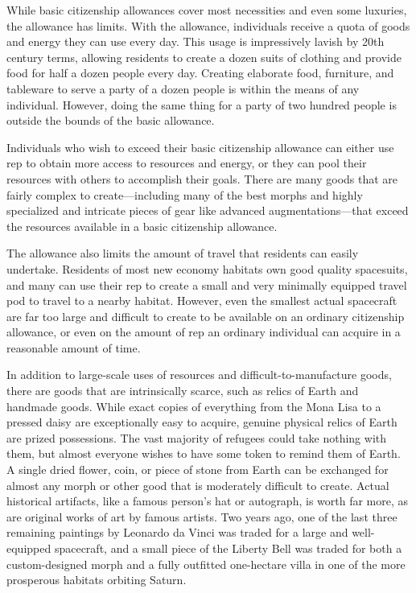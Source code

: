 While basic citizenship allowances cover most necessities and even some luxuries, the allowance has limits. 
With the allowance, individuals receive a quota of 
goods and energy they can use every day. This usage 
is impressively lavish by 20th century terms, allowing 
residents to create a dozen suits of clothing and provide food for half a dozen people every day. Creating 
elaborate food, furniture, and tableware to serve a 
party of a dozen people is within the means of any individual. However, doing the same thing for a party of 
two hundred people is outside the bounds of the basic 
allowance.

Individuals who wish to exceed their basic citizenship allowance can either use rep to obtain more 
access to resources and energy, or they can pool 
their resources with others to accomplish their goals. 
There are many goods that are fairly complex to 
create—including many of the best morphs and highly 
specialized and intricate pieces of gear like advanced 
augmentations—that exceed the resources available in 
a basic citizenship allowance.

The allowance also limits the amount of travel that 
residents can easily undertake. Residents of most new 
economy habitats own good quality spacesuits, and 
many can use their rep to create a small and very 
minimally equipped travel pod to travel to a nearby 
habitat. However, even the smallest actual spacecraft 
are far too large and difficult to create to be available 
on an ordinary citizenship allowance, or even on the 
amount of rep an ordinary individual can acquire in a 
reasonable amount of time.

In addition to large-scale uses of resources and 
difficult-to-manufacture goods, there are goods that 
are intrinsically scarce, such as relics of Earth and 
handmade goods. While exact copies of everything 
from the Mona Lisa to a pressed daisy are exceptionally easy to acquire, genuine physical relics of Earth 
are prized possessions. The vast majority of refugees 
could take nothing with them, but almost everyone 
wishes to have some token to remind them of Earth. A 
single dried flower, coin, or piece of stone from Earth 
can be exchanged for almost any morph or other 
good that is moderately difficult to create. Actual 
historical artifacts, like a famous person's hat or autograph, is worth far more, as are original works of 
art by famous artists. Two years ago, one of the last 
three remaining paintings by Leonardo da Vinci was 
traded for a large and well-equipped spacecraft, and 
a small piece of the Liberty Bell was traded for both 
a custom-designed morph and a fully outfitted one-hectare villa in one of the more prosperous habitats 
orbiting Saturn.

